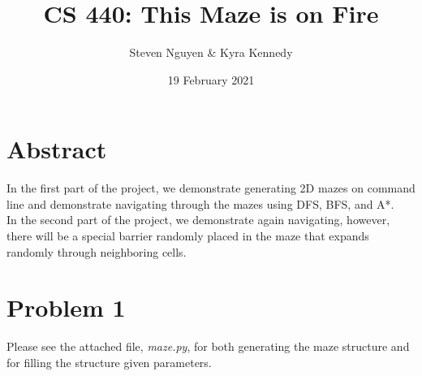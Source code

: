 \documentclass[12pt]{report}
\title{CS 440: This Maze is on Fire}
\author{Steven Nguyen \& Kyra Kennedy}
\date{19 February 2021}
\begin{document}
\begin{titlepage}
\maketitle
\end{titlepage}

\section{Abstract}
In the first part of the project, we demonstrate generating 2D mazes on command line and demonstrate navigating through the mazes using DFS, BFS, and A*.\\
In the second part of the project, we demonstrate again navigating, however, there will be a special barrier randomly placed in the maze that expands randomly through neighboring cells.

\section{Problem 1}
Please see the attached file, \emph{maze.py}, for both generating the maze structure and for filling the structure given parameters.

\break
\end{document}
